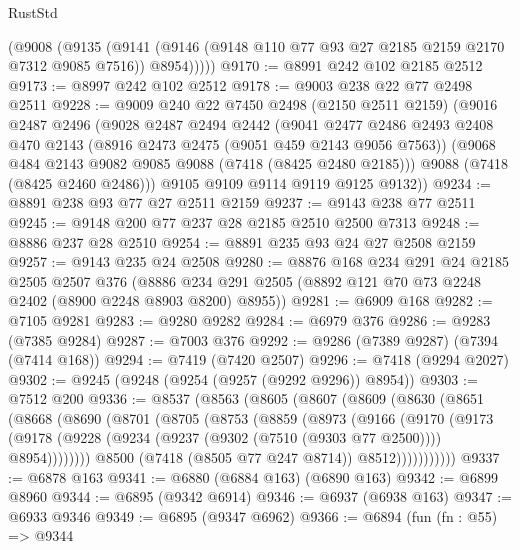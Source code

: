\begin{lexlean}{RustStd}
\begin{coremodule}
        (@9008
          (@9135
            (@9141 (@9146 (@9148 @110 @77 @93 @27 @2185 @2159 @2170 @7312 @9085 @7516)) @8954)))))
@9170 := @8991 @242 @102 @2185 @2512
@9173 := @8997 @242 @102 @2512
@9178 := @9003 @238 @22 @77 @2498 @2511
@9228 := @9009
    @240
    @22
    @7450
    @2498
    (@2150 @2511 @2159)
    (@9016
      @2487
      @2496
      (@9028
        @2487
        @2494
        @2442
        (@9041
          @2477
          @2486
          @2493
          @2408
          @470
          @2143
          (@8916 @2473 @2475 (@9051 @459 @2143 @9056 @7563))
          (@9068 @484 @2143 @9082 @9085 @9088 (@7418 (@8425 @2480 @2185)))
          @9088
          (@7418 (@8425 @2460 @2486)))
        @9105
        @9109
        @9114
        @9119
        @9125
        @9132))
@9234 := @8891 @238 @93 @77 @27 @2511 @2159
@9237 := @9143 @238 @77 @2511
@9245 := @9148 @200 @77 @237 @28 @2185 @2510 @2500 @7313
@9248 := @8886 @237 @28 @2510
@9254 := @8891 @235 @93 @24 @27 @2508 @2159
@9257 := @9143 @235 @24 @2508
@9280 := @8876
    @168
    @234
    @291
    @24
    @2185
    @2505
    @2507
    @376
    (@8886 @234 @291 @2505 (@8892 @121 @70 @73 @2248 @2402 (@8900 @2248 @8903 @8200) @8955))
@9281 := @6909 @168
@9282 := @7105 @9281
@9283 := @9280 @9282
@9284 := @6979 @376
@9286 := @9283 (@7385 @9284)
@9287 := @7003 @376
@9292 := @9286 (@7389 @9287) (@7394 (@7414 @168))
@9294 := @7419 (@7420 @2507)
@9296 := @7418 (@9294 @2027)
@9302 := @9245 (@9248 (@9254 (@9257 (@9292 @9296)) @8954))
@9303 := @7512 @200
@9336 := @8537
    (@8563
      (@8605
        (@8607
          (@8609
            (@8630
              (@8651
                (@8668
                  (@8690
                    (@8701
                      (@8705
                        (@8753
                          (@8859
                            (@8973
                              (@9166
                                (@9170
                                  (@9173
                                    (@9178
                                      (@9228
                                        (@9234
                                          (@9237 (@9302 (@7510 (@9303 @77 @2500))))
                                          @8954))))))))
                          @8500
                          (@7418 (@8505 @77 @247 @8714))
                          @8512)))))))))))
@9337 := @6878 @163
@9341 := @6880 (@6884 @163) (@6890 @163)
@9342 := @6899 @8960
@9344 := @6895 (@9342 @6914)
@9346 := @6937 (@6938 @163)
@9347 := @6933 @9346
@9349 := @6895 (@9347 @6962)
@9366 := @6894
    (fun (fn : @55) =>
    @9344

\end{coremodule}
\end{lexlean}
